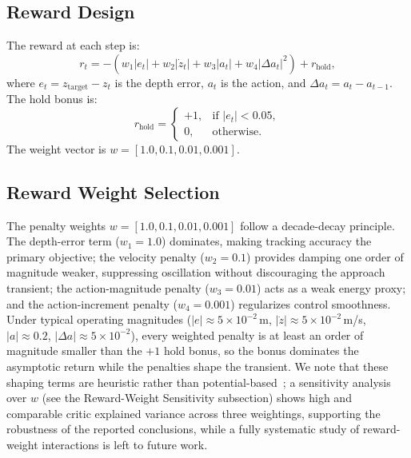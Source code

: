 \documentclass[conference]{IEEEtran}
\begin{document}
\subsection{Reward Design}
The reward at each step is:
\begin{equation}
r_t = -\left(w_1 |e_t| + w_2 |\dot{z}_t| + w_3 |a_t| + w_4 |\Delta a_t|^2\right) + r_{\text{hold}},
\end{equation}
where $e_t = z_{\text{target}} - z_t$ is the depth error, $a_t$ is the action, and $\Delta a_t = a_t - a_{t-1}$. The hold bonus is:
\begin{equation}
r_{\text{hold}} = \begin{cases}
+1, & \text{if } |e_t| < 0.05, \\
0,  & \text{otherwise.}
\end{cases}
\end{equation}
The weight vector is $w = [1.0, 0.1, 0.01, 0.001]$.

\subsection{Reward Weight Selection}
The penalty weights $w = [1.0, 0.1, 0.01, 0.001]$ follow a decade-decay principle. The depth-error term ($w_1 = 1.0$) dominates, making tracking accuracy the primary objective; the velocity penalty ($w_2 = 0.1$) provides damping one order of magnitude weaker, suppressing oscillation without discouraging the approach transient; the action-magnitude penalty ($w_3 = 0.01$) acts as a weak energy proxy; and the action-increment penalty ($w_4 = 0.001$) regularizes control smoothness. Under typical operating magnitudes ($|e| \approx 5\times10^{-2}$\,m, $|\dot{z}| \approx 5\times10^{-2}$\,m/s, $|a| \approx 0.2$, $|\Delta a| \approx 5\times10^{-2}$), every weighted penalty is at least an order of magnitude smaller than the $+1$ hold bonus, so the bonus dominates the asymptotic return while the penalties shape the transient. We note that these shaping terms are heuristic rather than potential-based~\cite{ng1999shaping}; a sensitivity analysis over $w$ (see the Reward-Weight Sensitivity subsection) shows high and comparable critic explained variance across three weightings, supporting the robustness of the reported conclusions, while a fully systematic study of reward-weight interactions is left to future work.
\end{document}

